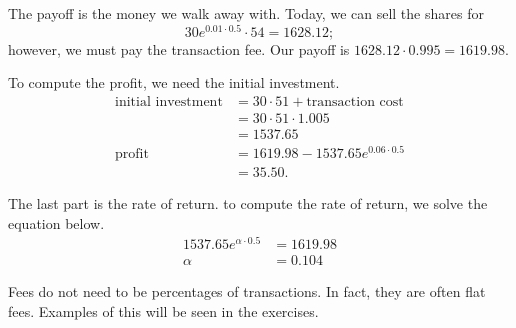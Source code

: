 \documentclass{ximera}
\begin{document}
\begin{solution}
The payoff is the money we walk away with. Today, we can sell the shares for 
	\begin{equation*}
	30e^{0.01\cdot 0.5}\cdot 54=1628.12;
	\end{equation*}
however, we must pay the transaction fee. Our payoff is $1628.12\cdot 0.995=1619.98$. 

To compute the profit, we need the initial investment. 
	\begin{align*}
	\text{initial investment}&=30\cdot 51+\text{transaction cost}\\
	&=30\cdot51\cdot 1.005\\
	&=1537.65\\
	\text{profit}&=1619.98-1537.65e^{0.06\cdot 0.5}\\
	&=35.50.
	\end{align*}

The last part is the rate of return. to compute the rate of return, we solve the equation below.
	\begin{align*}
	1537.65e^{\alpha\cdot 0.5}&=1619.98\\
	\alpha&=0.104
	\end{align*}
\end{solution}

Fees do not need to be percentages of transactions. In fact, they are often flat fees. Examples of this will be seen in the exercises.
\end{document}
